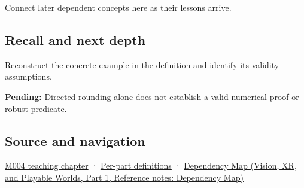 \hypertarget{appendix-1823a14330cb-used-by}{}

Connect later dependent concepts here as their lessons arrive.

\subsection{Recall and next depth}\label{appendix-1823a14330cb-recall-and-next-depth}

\hypertarget{appendix-1823a14330cb-recall-and-next-depth}{}

Reconstruct the concrete example in the definition and identify its validity assumptions.

\textbf{Pending:} Directed rounding alone does not establish a valid numerical proof or robust predicate.

\subsection{Source and navigation}\label{appendix-1823a14330cb-source-and-navigation}

\hypertarget{appendix-1823a14330cb-source-and-navigation}{}

\hyperref[01-foundations-i-ch001-a-stretching-ruler-for-real-valued-quantities]{M004 teaching chapter} · \hyperref[appendix-fd090d982a15-m004---parts-61-76]{Per-part definitions} · \href{../07-Vision-XR-and-Playable-Worlds-P01/main.pdf\#appendix-4ad47bdd269a}{Dependency Map (Vision, XR, and Playable Worlds, Part 1, Reference notes: Dependency Map)}
